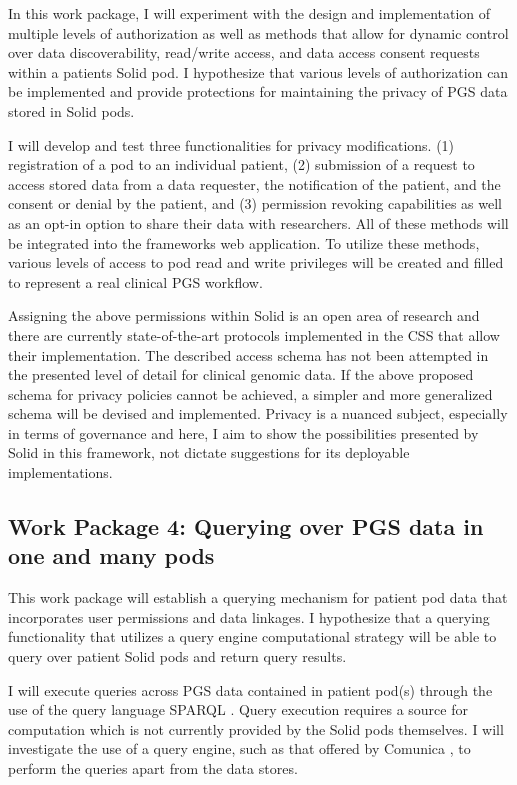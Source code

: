 \documentclass[runningheads]{llncs}
\begin{document}
In this work package, I will experiment with the design and implementation of multiple levels of authorization as well as methods that allow for dynamic control over data discoverability, read/write access, and data access consent requests within a patient\textquotesingle s Solid pod. 
I hypothesize that various levels of authorization can be implemented and provide protections for maintaining the privacy of PGS data stored in Solid pods.

I will develop and test three functionalities for privacy modifications.
(1) registration of a pod to an individual patient,
(2) submission of a request to access stored data from a data requester, the notification of the patient, and the consent or denial by the patient, and
(3) permission revoking capabilities as well as an opt-in option to share their data with researchers. 
All of these methods will be integrated into the framework\textquotesingle s web application.
To utilize these methods, various levels of access to pod read and write privileges will be created and filled to represent a real clinical PGS workflow. 

Assigning the above permissions within Solid is an open area of research and there are currently state-of-the-art protocols implemented in the CSS that allow their implementation.
The described access schema has not been attempted in the presented level of detail for clinical genomic data.
If the above proposed schema for privacy policies cannot be achieved, a simpler and more generalized schema will be devised and implemented.
Privacy is a nuanced subject, especially in terms of governance and here, I aim to show the possibilities presented by Solid in this framework, not dictate suggestions for its deployable implementations. 

\subsection{Work Package 4: Querying over PGS data in one and many pods}

This work package will establish a querying mechanism for patient pod data that incorporates user permissions and data linkages. 
I hypothesize that a querying functionality that utilizes a query engine computational strategy will be able to query over patient Solid pods and return query results.

I will execute queries across PGS data contained in patient pod(s) through the use of the query language SPARQL \cite{noauthor_sparql_nodate}.
Query execution requires a source for computation which is not currently provided by the Solid pods themselves.
I will investigate the use of a query engine, such as that offered by Comunica \cite{comunica}, to perform the queries apart from the data stores.
\end{document}
